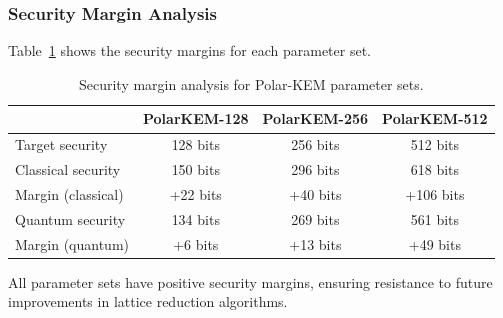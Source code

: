 \documentclass[11pt,a4paper]{article}
\newcommand{\polarKem}{\textsf{Polar-KEM}\xspace}
\begin{document}
\subsubsection{Security Margin Analysis}

Table~\ref{tab:security-margins} shows the security margins for each parameter set.

\begin{table}[H]
\centering
\caption{Security margin analysis for \polarKem parameter sets.}
\label{tab:security-margins}
\begin{tabular}{@{}lccc@{}}
\toprule
 & \textbf{PolarKEM-128} & \textbf{PolarKEM-256} & \textbf{PolarKEM-512} \\
\midrule
Target security & 128 bits & 256 bits & 512 bits \\
Classical security & 150 bits & 296 bits & 618 bits \\
Margin (classical) & +22 bits & +40 bits & +106 bits \\
Quantum security & 134 bits & 269 bits & 561 bits \\
Margin (quantum) & +6 bits & +13 bits & +49 bits \\
\bottomrule
\end{tabular}
\end{table}

All parameter sets have positive security margins, ensuring resistance to future improvements in lattice reduction algorithms.
\end{document}
